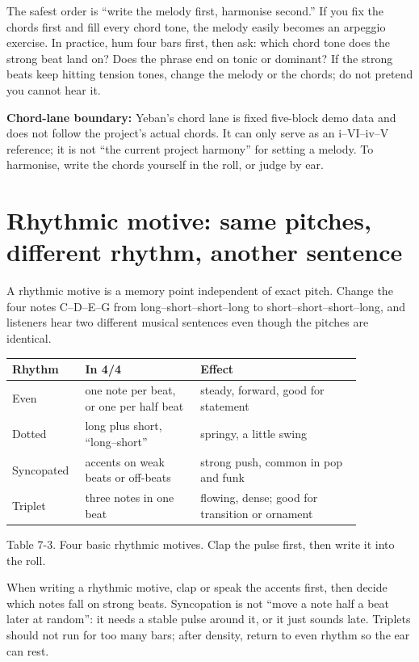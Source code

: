 The safest order is ``write the melody first, harmonise second.'' If you fix the chords first and fill every chord tone, the melody easily becomes an arpeggio exercise. In practice, hum four bars first, then ask: which chord tone does the strong beat land on? Does the phrase end on tonic or dominant? If the strong beats keep hitting tension tones, change the melody or the chords; do not pretend you cannot hear it.

\textbf{Chord-lane boundary:} Yeban's chord lane is fixed five-block demo data and does not follow the project's actual chords. It can only serve as an i--VI--iv--V reference; it is not ``the current project harmony'' for setting a melody. To harmonise, write the chords yourself in the roll, or judge by ear.

\section{Rhythmic motive: same pitches, different rhythm, another sentence}

A rhythmic motive is a memory point independent of exact pitch. Change the four notes C--D--E--G from long--short--short--long to short--short--short--long, and listeners hear two different musical sentences even though the pitches are identical.

\begin{center}
\small
\begin{tabular}{p{0.14\linewidth}p{0.30\linewidth}p{0.42\linewidth}}
\toprule
Rhythm & In 4/4 & Effect \\
\midrule
Even & one note per beat, or one per half beat & steady, forward, good for statement \\
Dotted & long plus short, ``long--short'' & springy, a little swing \\
Syncopated & accents on weak beats or off-beats & strong push, common in pop and funk \\
Triplet & three notes in one beat & flowing, dense; good for transition or ornament \\
\bottomrule
\end{tabular}

Table 7-3. Four basic rhythmic motives. Clap the pulse first, then write it into the roll.
\end{center}

When writing a rhythmic motive, clap or speak the accents first, then decide which notes fall on strong beats. Syncopation is not ``move a note half a beat later at random'': it needs a stable pulse around it, or it just sounds late. Triplets should not run for too many bars; after density, return to even rhythm so the ear can rest.

